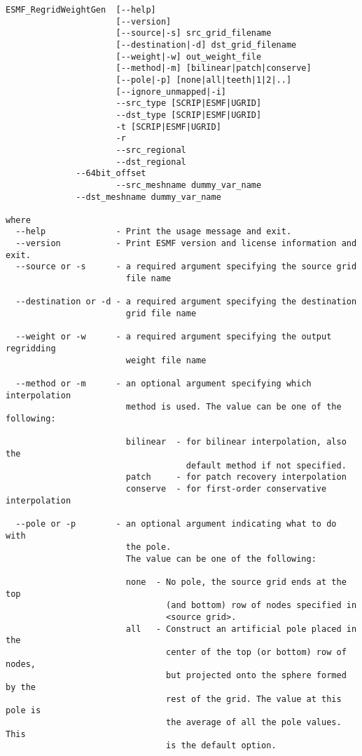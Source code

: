 \begin{verbatim}
ESMF_RegridWeightGen  [--help]
                      [--version]
                      [--source|-s] src_grid_filename 
                      [--destination|-d] dst_grid_filename 
                      [--weight|-w] out_weight_file 
                      [--method|-m] [bilinear|patch|conserve] 
                      [--pole|-p] [none|all|teeth|1|2|..] 
                      [--ignore_unmapped|-i]
                      --src_type [SCRIP|ESMF|UGRID] 
                      --dst_type [SCRIP|ESMF|UGRID]
                      -t [SCRIP|ESMF|UGRID]
                      -r
                      --src_regional
                      --dst_regional
		      --64bit_offset
                      --src_meshname dummy_var_name
		      --dst_meshname dummy_var_name

where
  --help              - Print the usage message and exit.
  --version           - Print ESMF version and license information and exit.
  --source or -s      - a required argument specifying the source grid 
                        file name

  --destination or -d - a required argument specifying the destination 
                        grid file name

  --weight or -w      - a required argument specifying the output regridding 
                        weight file name

  --method or -m      - an optional argument specifying which interpolation 
                        method is used. The value can be one of the following:

                        bilinear  - for bilinear interpolation, also the 
                                    default method if not specified.
                        patch     - for patch recovery interpolation
                        conserve  - for first-order conservative interpolation

  --pole or -p        - an optional argument indicating what to do with 
                        the pole.  
                        The value can be one of the following:

                        none  - No pole, the source grid ends at the top 
                                (and bottom) row of nodes specified in 
                                <source grid>.
                        all   - Construct an artificial pole placed in the 
                                center of the top (or bottom) row of nodes, 
                                but projected onto the sphere formed by the 
                                rest of the grid. The value at this pole is 
                                the average of all the pole values. This
                                is the default option.


\end{verbatim}
